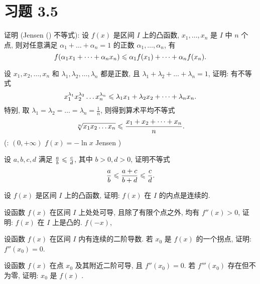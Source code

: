 \section{习题 3.5}

\begin{exercise}[3.5.1]
    证明 (Jensen () 不等式): 设 $f(x)$ 是区间 $I$ 上的凸函数, $x_1, \dots, x_n$ 是 $I$ 中 $n$ 个点, 则对任意满足 $\alpha_1 + \dots + \alpha_n = 1$ 的正数 $\alpha_1, \dots, \alpha_n$, 有
    $$f(\alpha_1 x_1 + \dots + \alpha_n x_n) \leqslant \alpha_1 f(x_1) + \dots + \alpha_n f(x_n).$$
\end{exercise}

\begin{exercise}[3.5.2]
    设 $x_1, x_2, \dots, x_n$ 和 $\lambda_1, \lambda_2, \dots, \lambda_n$ 都是正数, 且 $\lambda_1 + \lambda_2 + \dots + \lambda_n = 1$, 证明: 有不等式
    $$x_1^{\lambda_1} x_2^{\lambda_2} \dots x_n^{\lambda_n} \leqslant \lambda_1 x_1 + \lambda_2 x_2 + \dots + \lambda_n x_n.$$
    特别, 取 $\lambda_1 = \lambda_2 = \dots = \lambda_n = \frac{1}{n}$, 则得到算术平均不等式
    $$\sqrt[n]{x_1 x_2 \dots x_n} \leqslant \frac{x_1 + x_2 + \dots + x_n}{n}.$$
    (:  $(0, +\infty)$  $f(x) = -\ln x$  Jensen )
\end{exercise}

\begin{exercise}[3.5.3]
    设 $a, b, c, d$ 满足 $\frac{a}{b} \leqslant \frac{c}{d}$, 其中 $b>0, d>0$, 证明不等式
    $$\frac{a}{b} \leqslant \frac{a+c}{b+d} \leqslant \frac{c}{d}.$$
\end{exercise}

\begin{exercise}[3.5.4]
    设 $f(x)$ 是区间 $I$ 上的凸函数, 证明: $f(x)$ 在 $I$ 的内点是连续的.
\end{exercise}

\begin{exercise}[3.5.5]
    设函数 $f(x)$ 在区间 $I$ 上处处可导, 且除了有限个点之外, 均有 $f''(x) > 0$, 证明: $f(x)$ 在 $I$ 上是凸的.  $f(-x)$, 
\end{exercise}

\begin{exercise}[3.5.6]
    设函数 $f(x)$ 在区间 $I$ 内有连续的二阶导数. 若 $x_0$ 是 $f(x)$ 的一个拐点, 证明: $f''(x_0) = 0$.
\end{exercise}

\begin{exercise}[3.5.7]
    设函数 $f(x)$ 在点 $x_0$ 及其附近二阶可导, 且 $f''(x_0) = 0$. 若 $f'''(x_0)$ 存在但不为零, 证明: $x_0$ 是 $f(x)$ .
\end{exercise}

